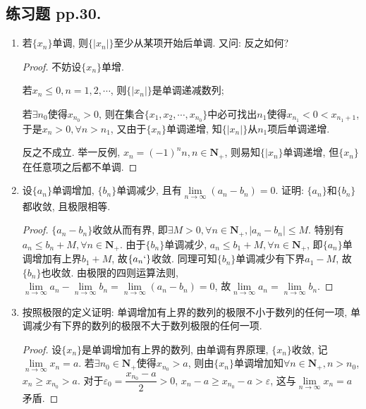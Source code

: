 \documentclass[a4paper,11pt,twoside]{ctexbook}
\begin{document}
\subsection{练习题 pp.30.}
\begin{enumerate}
	\item 若$\{x_n\}$单调, 则$\{|x_n|\}$至少从某项开始后单调. 又问: 反之如何?
	      \begin{proof}
		      不妨设$\{x_n\}$单增.

		      若$x_n\leqslant 0, n=1,2,\cdots$, 则$\{|x_n|\}$是单调递减数列;

		      若$\exists n_0$使得$x_{n_0}>0$, 则在集合$\{x_1, x_2,\cdots,x_{n_0}\}$中必可找出$n_1$使得$x_{n_1}<0<x_{n_1+1}$, 于是$x_n>0, \forall n>n_1$, 又由于$\{x_n\}$单调递增, 知$\{|x_n|\}$从$n_1$项后单调递增.

		      反之不成立. 举一反例, $x_n=(-1)^nn, n\in\mathbf{N}_{+}$, 则易知$\{|x_n\}$单调递增, 但$\{x_n\}$在任意项之后都不单调.\qedhere
	      \end{proof}
	\item 设$\{a_n\}$单调增加, $\{b_n\}$单调减少, 且有$\lim\limits_{n\to\infty} (a_n-b_n)=0$. 证明: $\{a_n\}$和$\{b_n\}$都收敛, 且极限相等.
	      \begin{proof}
		      $\{a_n-b_n\}$收敛从而有界, 即$\exists M>0, \forall n\in\mathbf{N}_{+}, |a_n-b_n|\leqslant M$. 特别有$a_n\leqslant b_n+M, \forall n\in\mathbf{N}_{+}$. 由于$\{b_n\}$单调减少, $a_n\leqslant b_1+M, \forall n\in\mathbf{N}_{+}$, 即$\{a_n\}$单调增加有上界$b_1+M$, 故$\{a_n`\}$收敛. 同理可知$\{b_n\}$单调减少有下界$a_1-M$, 故$\{b_n\}$也收敛. 由极限的四则运算法则, $\lim\limits_{n\to\infty} a_n-\lim\limits_{n\to\infty} b_n=\lim\limits_{n\to\infty} (a_n-b_n)=0$, 故$\lim\limits_{n\to\infty} a_n=\lim\limits_{n\to\infty} b_n$.\qedhere
	      \end{proof}
	\item 按照极限的定义证明: 单调增加有上界的数列的极限不小于数列的任何一项, 单调减少有下界的数列的极限不大于数列极限的任何一项.
	      \begin{proof}
		      设$\{x_n\}$是单调增加有上界的数列, 由单调有界原理, $\{x_n\}$收敛, 记$\lim\limits_{n\to\infty} x_n=a$. 若$\exists n_0\in\mathbf{N}_{+}$使得$x_{n_0}>a$, 则由$\{x_n\}$单调增加知$\forall n\in\mathbf{N}_{+}, n>n_0$, $x_n\geqslant x_{n_0}>a$. 对于$\varepsilon_0=\dfrac{x_{n_0}-a}{2}>0$, $x_n-a\geqslant x_{n_0}-a>\varepsilon$, 这与$\lim\limits_{n\to\infty} x_n=a$矛盾.


\end{proof}
\end{enumerate}
\end{document}
